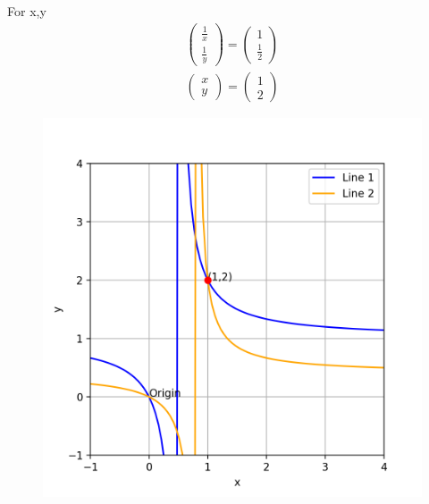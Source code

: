 \documentclass[journal]{IEEEtran}
\begin{document}
For x,y
\begin{align}
    \begin{pmatrix}\frac{1}{x}\\\frac{1}{y}\end{pmatrix}=\begin{pmatrix}1 \\ \frac{1}{2}\end{pmatrix}\\
    \begin{pmatrix}x\\y\end{pmatrix}=\begin{pmatrix}1 \\ 2\end{pmatrix}
\end{align}
\begin{figure}[H]
    \centering
    \includegraphics[width=\columnwidth]{figs/figure.png}
    \caption{}
    \label{fig:placeholder}
\end{figure}
\end{document}
